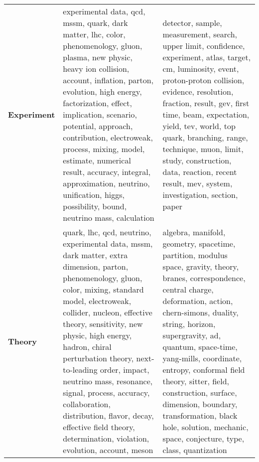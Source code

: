 \begin{longtable}{p{3cm}|p{5cm}|p{5cm}}
\bottomrule
\endlastfoot
\textbf{Experiment} &                                      experimental data, qcd, mssm, quark, dark matter, lhc, color, phenomenology, gluon, plasma, new physic, heavy ion collision, account, inflation, parton, evolution, high energy, factorization, effect, implication, scenario, potential, approach, contribution, electroweak, process, mixing, model, estimate, numerical result, accuracy, integral, approximation, neutrino, unification, higgs, possibility, bound, neutrino mass, calculation &                                                    detector, sample, measurement, search, upper limit, confidence, experiment, atlas, target, cm, luminosity, event, proton-proton collision, evidence, resolution, fraction, result, gev, first time, beam, expectation, yield, tev, world, top quark, branching, range, technique, muon, limit, study, construction, data, reaction, recent result, mev, system, investigation, section, paper \\
\textbf{Theory    } &  quark, lhc, qcd, neutrino, experimental data, mssm, dark matter, extra dimension, parton, phenomenology, gluon, color, mixing, standard model, electroweak, collider, nucleon, effective theory, sensitivity, new physic, high energy, hadron, chiral perturbation theory, next-to-leading order, impact, neutrino mass, resonance, signal, process, accuracy, collaboration, distribution, flavor, decay, effective field theory, determination, violation, evolution, account, meson &  algebra, manifold, geometry, spacetime, partition, modulus space, gravity, theory, branes, correspondence, central charge, deformation, action, chern-simons, duality, string, horizon, supergravity, ad, quantum, space-time, yang-mills, coordinate, entropy, conformal field theory, sitter, field, construction, surface, dimension, boundary, transformation, black hole, solution, mechanic, space, conjecture, type, class, quantization \\
\end{longtable}
